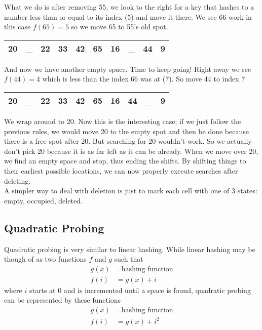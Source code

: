 \documentclass[11pt]{book}
\begin{document}
		\noindent What we do is after removing 55, we look to the right for a key that
		hashes to a number less than or equal to its index (5) and move it there. We
		see 66 work in this case $f(65) = 5$ so we move 65 to 55's old spot.
		\begin{center}
			\begin{tabular}{|c|c|c|c|c|c|c|c|c|c|}
				\hline
				20 & \_ & 22 & 33 & 42 & 65 & 16 & \_ & 44 & 9 \\
				\hline
			\end{tabular}
		\end{center}
		And now we have another empty space. Time to keep going! Right away we see
		$f(44) = 4$ which is less than the index 66 was at (7). So move 44 to index 7
		\begin{center}
			\begin{tabular}{|c|c|c|c|c|c|c|c|c|c|}
				\hline
				20 & \_ & 22 & 33 & 42 & 65 & 16 & 44 & \_ & 9 \\
				\hline
			\end{tabular}
		\end{center}
		We wrap around to 20. Now this is the interesting case; if we just follow the
		previous rules, we would move 20 to the empty spot and then be done because there
		is a free spot after 20. But searching for 20 wouldn't work. So we actually don't
		pick 20 because it is as far left as it can be already. When we move over 20, we
		find an empty space and stop, thus ending the shifts. By shifting things to their
		earliest possible locations, we can now properly execute searches after
		deleting. \\

		\noindent A simpler way to deal with deletion is just to mark each cell with one
		of 3 states: empty, occupied, deleted.

	\subsection{Quadratic Probing}
		Quadratic probing is very similar to linear hashing. While linear hashing may
		be though of as two functions $f$ and $g$ such that
		\begin{align}
			g(x) &= \text{hashing function} \\
			f(i) &= g(x) + i
		\end{align}
		where $i$ starts at 0 and is incremented until a space is found, quadratic probing
		can be represented by these functions
		\begin{align}
			g(x) &= \text{hashing function} \\
			f(i) &= g(x) + i^2
		\end{align}
\end{document}
